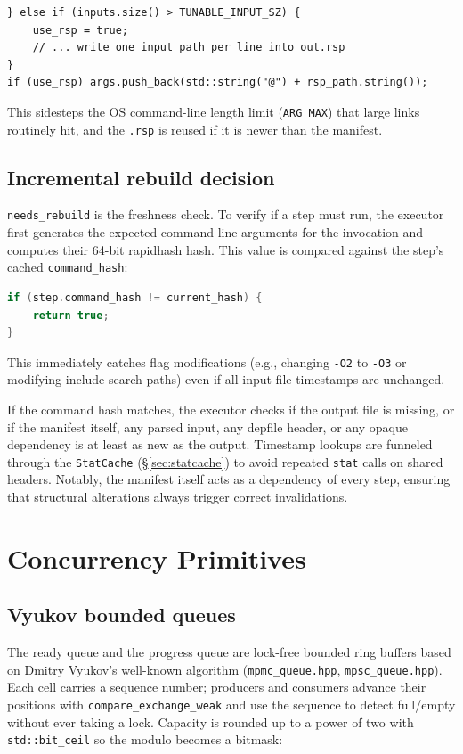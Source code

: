 \documentclass[11pt]{article}
\begin{document}
\begin{lstlisting}
} else if (inputs.size() > TUNABLE_INPUT_SZ) {
    use_rsp = true;
    // ... write one input path per line into out.rsp
}
if (use_rsp) args.push_back(std::string("@") + rsp_path.string());
\end{lstlisting}

This sidesteps the OS command-line length limit (\texttt{ARG\_MAX}) that large
links routinely hit, and the \texttt{.rsp} is reused if it is newer than the
manifest.

\subsection{Incremental rebuild decision}

\lstinline|needs_rebuild| is the freshness check. To verify if a step must run, the executor first generates the expected command-line arguments for the invocation and computes their 64-bit rapidhash hash. This value is compared against the step's cached \lstinline|command_hash|:
\begin{lstlisting}[language=C++]
if (step.command_hash != current_hash) {
    return true;
}
\end{lstlisting}
This immediately catches flag modifications (e.g., changing \lstinline|-O2| to \lstinline|-O3| or modifying include search paths) even if all input file timestamps are unchanged.

If the command hash matches, the executor checks if the output file is missing, or if the manifest itself, any parsed input, any depfile header, or any opaque dependency is at least as new as the output. Timestamp lookups are funneled through the \lstinline|StatCache| (\S\ref{sec:statcache}) to avoid repeated \lstinline|stat| calls on shared headers. Notably, the manifest itself acts as a dependency of every step, ensuring that structural alterations always trigger correct invalidations.

\section{Concurrency Primitives}

\subsection{Vyukov bounded queues}

The ready queue and the progress queue are lock-free bounded ring buffers based
on Dmitry Vyukov's well-known algorithm (\texttt{mpmc\_queue.hpp},
\texttt{mpsc\_queue.hpp}). Each cell carries a sequence number; producers and
consumers advance their positions with \lstinline|compare_exchange_weak| and use
the sequence to detect full/empty without ever taking a lock. Capacity is
rounded up to a power of two with \lstinline|std::bit_ceil| so the modulo
becomes a bitmask:
\end{document}
